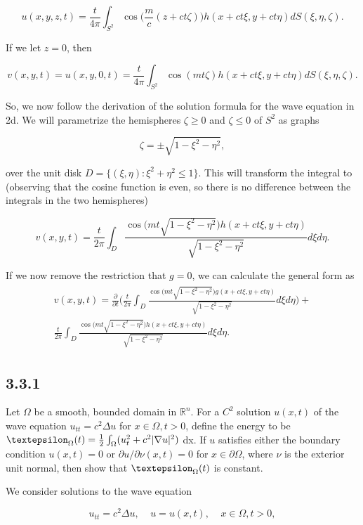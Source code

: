 \documentclass{article}
\begin{document}
$$u(x,y,z,t)=\frac{t}{4\pi}\int_{S^2}\cos\Big(\frac{m}{c}(z+ct\zeta)\Big)h(x+ct\xi,y+ct\eta)dS(\xi,\eta,\zeta).$$

If we let $z=0$, then

$$v(x,y,t)=u(x,y,0,t)=\frac{t}{4\pi}\int_{S^2}\cos(mt\zeta)h(x+ct\xi,y+ct\eta)dS(\xi,\eta,\zeta).$$

So, we now follow the derivation of the solution formula for the wave equation in 2d. We will parametrize the hemispheres $\zeta \geq 0$ and $\zeta \leq 0$ of $S^2$ as graphs

$$\zeta = \pm\sqrt{1-\xi^2-\eta^2},$$

over the unit disk $D = \{(\xi,\eta) : \xi^2 + \eta^2 \leq 1\}$. This will transform the integral to (observing that the cosine function is even, so there is no difference between the integrals in the two hemispheres)

$$v(x,y,t)=\frac{t}{2\pi}\int_D \frac{\cos\Big(mt\sqrt{1-\xi^2-\eta^2}\Big)h(x+ct\xi,y+ct\eta)}{\sqrt{1-\xi^2-\eta^2}}d\xi d\eta.$$

If we now remove the restriction that $g=0$, we can calculate the general form as
\begin{align*}
\begin{split}
v(x,y,t)=\frac{\partial}{\partial t}\Bigg(\frac{t}{2\pi}\int_D\frac{\cos\Big(mt\sqrt{1-\xi^2-\eta^2}\Big)g(x+ct\xi,y+ct\eta)}{\sqrt{1-\xi^2-\eta^2}}d\xi d\eta\Bigg) +\\ \frac{t}{2\pi}\int_D \frac{\cos\Big(mt\sqrt{1-\xi^2-\eta^2}\Big)h(x+ct\xi,y+ct\eta)}{\sqrt{1-\xi^2-\eta^2}}d\xi d\eta.
\end{split}
\end{align*}


\subsection{\textbf{3.3.1}} Let $\Omega$ be a smooth, bounded domain in $\mathbb R^n$. For a $C^2$ solution $u(x,t)$ of the wave equation $u_{tt}=c^2\Delta u$ for $x\in\Omega,t>0$, define the energy to be $\textepsilon_{\Omega}(t)=\frac{1}{2}\int_{\Omega}(u_t^2+c^2|\nabla u|^2)$ dx. If $u$ satisfies either the boundary condition $u(x,t)=0$ or $\partial u / \partial \nu(x,t)=0$ for $x\in\partial\Omega$, where $\nu$ is the exterior unit normal, then show that $\textepsilon_{\Omega}(t)$ is constant.

We consider solutions to the wave equation

$$u_{tt}=c^2\Delta u, ~~~~~u=u(x,t),  ~~~~~x\in\Omega,t>0,$$
\end{document}
